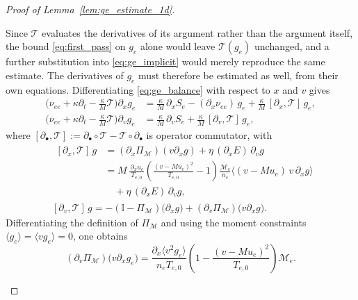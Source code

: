 \documentclass[pdflatex,final,10pt]{article}
\newcommand{\Liu}[1]{#1}
\begin{document}
\begin{proof}[Proof of Lemma~\ref{lem:ge_estimate_1d}]
\begin{enumerate}
\begin{enumerate}
Since $\mathcal{T}$ evaluates the derivatives of its argument rather than the
argument itself, the bound \eqref{eq:first_pass} on $g_e$ alone would leave
$\mathcal{T}(g_e)$ unchanged, and a further substitution into
\eqref{eq:ge_implicit} would merely reproduce the same estimate. The
derivatives of $g_e$ must therefore be estimated as well, from their own
equations. Differentiating \eqref{eq:ge_balance} with respect to $x$ and $v$
gives
\begin{align}
    \Big(\nu_{ee}+\kappa\partial_t-\tfrac{\kappa}{M}\mathcal{T}\Big)
    \partial_x g_e
    &= \frac{\kappa}{M}\,\partial_x S_e
       - (\partial_x \nu_{ee})\, g_e
       + \frac{\kappa}{M}\,[\partial_x,\mathcal{T}]\, g_e ,
       \label{eq:dx_equation} \\[2pt]
    \Big(\nu_{ee}+\kappa\partial_t-\tfrac{\kappa}{M}\mathcal{T}\Big)
    \partial_v g_e
    &= \frac{\kappa}{M}\,\partial_v S_e
       + \frac{\kappa}{M}\,[\partial_v,\mathcal{T}]\, g_e ,
       \label{eq:dv_equation}
\end{align}
where $[\partial_\bullet,\mathcal{T}] := \partial_\bullet\circ\mathcal{T} - \mathcal{T}\circ\partial_\bullet$ is operator commutator, with
\begin{align} \label{eq:commutator_x}
    &\begin{aligned}
        [\partial_x,\mathcal{T}]\, g
    &= \left(\partial_x \Liu{\Pi}_{\mathcal{M}}\right) (v \partial_x g) + \eta\, (\partial_x E)\, \partial_v g \\
    &=M \, \frac{\,\partial_x u_e}{T_{e,0}} \left( \frac{(v-Mu_e)^2}{T_{e,0}} - 1 \right)
      \frac{\mathcal{M}_e}{n_e} \big\langle (v-Mu_e)\, v\, \partial_x g \big\rangle\\
      &\quad+ \eta\, (\partial_x E)\, \partial_v g ,
    \end{aligned}\\
    &[\partial_v,\mathcal{T}]\, g =  -(\mathbb{I}-\Pi_{\mathcal{M}})\big(\partial_x g\big) +\Liu{(\partial_v\Pi_{\mathcal{M}})
    \bigl(v\partial_x g\bigr)}.
\end{align}
\Liu{Differentiating the definition of $\Pi_{\mathcal{M}}$ and using the moment
constraints $\langle g_e\rangle=\langle vg_e\rangle=0$, one obtains
\begin{equation*}
    (\partial_v\Pi_{\mathcal{M}})
    \bigl(v\partial_xg_e\bigr)
    =
    \frac{\partial_x\langle v^2g_e\rangle}
         {n_eT_{e,0}}
    \left(
        1-\frac{(v-Mu_e)^2}{T_{e,0}}
    \right)\mathcal{M}_e .
\end{equation*}
}


\end{enumerate}
\end{enumerate}
\end{proof}
\end{document}
